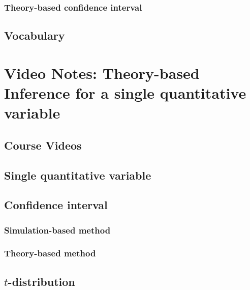 \documentclass[
]{report}
\begin{document}
\subsubsection*{Theory-based confidence interval}\label{theory-based-confidence-interval-1}

\subsection*{Vocabulary}\label{vocabulary-5}

\section{Video Notes: Theory-based Inference for a single quantitative variable}\label{video-notes-theory-based-inference-for-a-single-quantitative-variable}

\subsection{Course Videos}\label{course-videos-5}

\subsection{Single quantitative variable}\label{single-quantitative-variable}

\subsection*{Confidence interval}\label{confidence-interval}

\subsubsection*{Simulation-based method}\label{simulation-based-method-3}

\subsubsection*{Theory-based method}\label{theory-based-method-2}

\subsection*{\texorpdfstring{\(t\)-distribution}{t-distribution}}\label{t-distribution-1}
\end{document}
